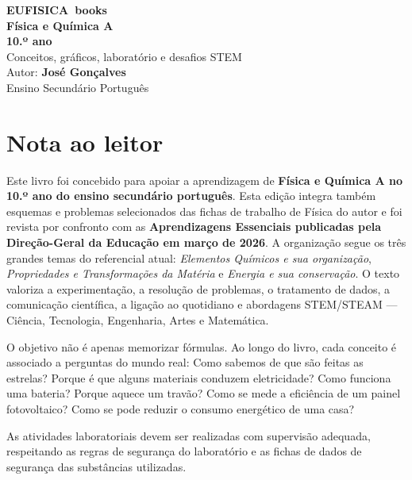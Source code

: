 \documentclass[11pt,a4paper,oneside]{book}
\newcommand{\EUFISICA}{\textsc{EUFISICA}}
\begin{document}
\begin{titlepage}
\vspace*{2.1cm}
\hspace*{5.1cm}
\begin{minipage}{0.62\textwidth}
{\color{white}\Large\textbf{\EUFISICA\ books}}\\[1.2cm]
{\color{white}\fontsize{31}{35}\selectfont\bfseries Física e Química A}\\[0.35cm]
{\color{eucyan}\fontsize{25}{29}\selectfont\bfseries 10.º ano}\\[0.9cm]
{\color{white}\Large Conceitos, gráficos, laboratório e desafios STEM}\\[1.6cm]
{\color{white}\large Autor: \textbf{José Gonçalves}}\\[0.25cm]
{\color{white}\normalsize Ensino Secundário Português}
\end{minipage}

\vfill
{}
\end{titlepage}

\frontmatter

\chapter*{Nota ao leitor}
Este livro foi concebido para apoiar a aprendizagem de \textbf{Física e Química A no 10.º ano do ensino secundário português}. Esta edição integra também esquemas e problemas selecionados das fichas de trabalho de Física do autor e foi revista por confronto com as \textbf{Aprendizagens Essenciais publicadas pela Direção-Geral da Educação em março de 2026}. A organização segue os três grandes temas do referencial atual: \textit{Elementos Químicos e sua organização}, \textit{Propriedades e Transformações da Matéria} e \textit{Energia e sua conservação}. O texto valoriza a experimentação, a resolução de problemas, o tratamento de dados, a comunicação científica, a ligação ao quotidiano e abordagens STEM/STEAM — Ciência, Tecnologia, Engenharia, Artes e Matemática.

O objetivo não é apenas memorizar fórmulas. Ao longo do livro, cada conceito é associado a perguntas do mundo real: Como sabemos de que são feitas as estrelas? Porque é que alguns materiais conduzem eletricidade? Como funciona uma bateria? Porque aquece um travão? Como se mede a eficiência de um painel fotovoltaico? Como se pode reduzir o consumo energético de uma casa?

\begin{nota}
As atividades laboratoriais devem ser realizadas com supervisão adequada, respeitando as regras de segurança do laboratório e as fichas de dados de segurança das substâncias utilizadas.
\end{nota}
\end{document}
